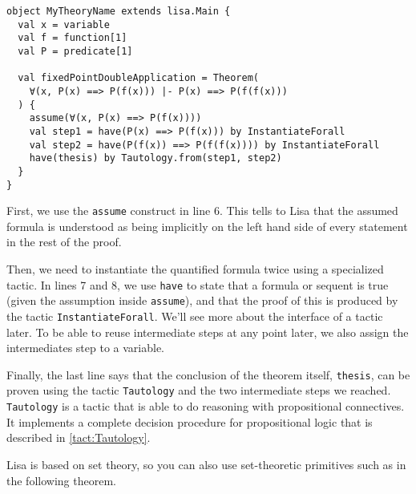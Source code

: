 \noindent\begin{minipage}{\linewidth}\vspace{1em}
\begin{lstlisting}[language=lisa, frame=single]
object MyTheoryName extends lisa.Main {
  val x = variable
  val f = function[1]
  val P = predicate[1]

  val fixedPointDoubleApplication = Theorem( 
    ∀(x, P(x) ==> P(f(x))) |- P(x) ==> P(f(f(x)))
  ) {
    assume(∀(x, P(x) ==> P(f(x))))
    val step1 = have(P(x) ==> P(f(x))) by InstantiateForall
    val step2 = have(P(f(x)) ==> P(f(f(x)))) by InstantiateForall
    have(thesis) by Tautology.from(step1, step2)
  } 
}
\end{lstlisting}
\end{minipage}
First, we use the \lstinline|assume| construct in line 6.
This tells to Lisa that the assumed formula is understood as being implicitly on the left hand side of every statement in the rest of the proof. 

Then, we need to instantiate the quantified formula twice using a specialized tactic. In lines 7 and 8, we use \lstinline|have| to state that a formula or sequent is true (given the assumption inside \lstinline|assume|), and that the proof of this is produced by the tactic \lstinline|InstantiateForall|.
We'll see more about the interface of a tactic later. To be able to reuse intermediate steps at any point later, we also assign the intermediates step to a variable.

Finally, the last line says that the conclusion of the theorem itself, \lstinline|thesis|, can be proven using the tactic \lstinline|Tautology| and the two intermediate steps we reached. \lstinline|Tautology| is a tactic that is able to do reasoning with propositional connectives. It implements a complete decision procedure for propositional logic that is described in \autoref{tact:Tautology}.

Lisa is based on set theory, so you can also use set-theoretic primitives such as in the following theorem.

